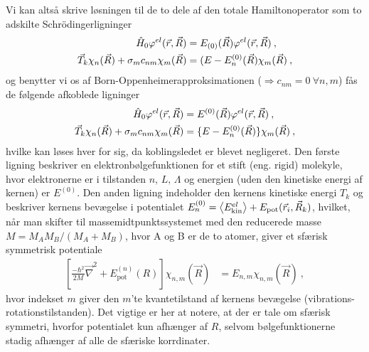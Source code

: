 Vi kan altså skrive løsningen til de to dele af den totale Hamiltonoperator som to adskilte Schrödingerligninger
\begin{align}
    \Hat{H}_0 \phi^{el}(\Vec{r}, \Vec{R}) &= E_{(0)}(\Vec{R})\phi^{el}(\Vec{r}, \Vec{R}) \: , \\
    \Vec{T}_k \chi_n(\Vec{R}) + \sigma_m c_{nm} \chi_m(\Vec{R}) &= (E - E_n^{(0)}(\Vec{R}) \chi_m(\Vec{R}) \: ,
\end{align}
og benytter vi os af Born-Oppenheimerapproksimationen ($\Rightarrow c_{nm} = 0 \: \forall n,m$) fås de følgende afkoblede ligninger
\begin{align}
    \Hat{H}_0 \phi^{el}(\Vec{r}, \Vec{R}) &= E^{(0)}(\Vec{R})\phi^{el}(\Vec{r}, \Vec{R}) \: , \\
    \Vec{T}_k \chi_n(\Vec{R}) + \sigma_m c_{nm} \chi_m(\Vec{R}) &= \{E - E_n^{(0)}(\Vec{R})\} \chi_m(\Vec{R}) \: ,
\end{align}
hvilke kan løses hver for sig, da koblingsledet er blevet negligeret.
Den første ligning beskriver en elektronbølgefunktionen for et stift (eng. rigid) molekyle, hvor elektronerne er i tilstanden $n,\, L,\, \Lambda$ og energien (uden den kinetiske energi af kernen) er $E^{(0)}$. Den anden ligning indeholder den kernens kinetiske energi $T_k$ og beskriver kernens bevægelse i potentialet $E_n^{(0)} = \braket{E_\text{kin}^{el}} + E_\text{pot}(\Vec{r}_i, \Vec{R}_k)$, hvilket, når man skifter til massemidtpunktssystemet med den reducerede masse $M = M_A M_B / (M_A + M_B)$, hvor A og B er de to atomer, giver et sfærisk symmetrisk potentiale
\begin{align} \label{eq:Q20_EquationWithSphericalSymmetricPotential}
    \left[\frac{-\hbar^2}{2M}\Vec{\nabla}^2 + E_\text{pot}^(n)(R)\right] \chi_{n,m}(\Vec{R}) &= E_{n,m}\chi_{n,m}(\Vec{R}) \: ,
\end{align}
hvor indekset $m$ giver den $m$'te kvantetilstand af kernens bevægelse (vibrations-rotationstilstanden). Det vigtige er her at notere, at der er tale om sfærisk symmetri, hvorfor potentialet kun afhænger af $R$, selvom bølgefunktionerne stadig afhænger af alle de sfæriske korrdinater.

